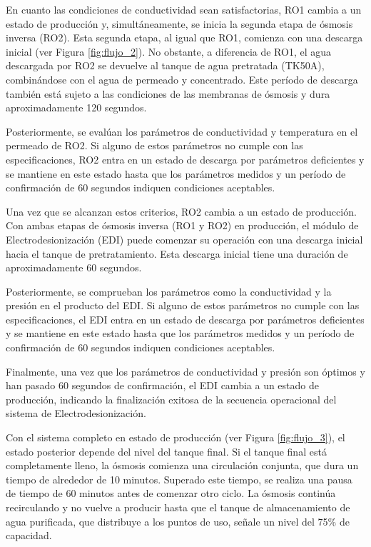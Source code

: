 En cuanto las condiciones de conductividad sean satisfactorias, RO1 cambia a un estado de producción
y, simultáneamente, se inicia la segunda etapa de ósmosis inversa (RO2). Esta segunda etapa, al
igual que RO1, comienza con una descarga inicial (ver Figura \ref{fig:flujo_2}). No obstante, a diferencia de RO1, el agua
descargada por RO2 se devuelve al tanque de agua pretratada (TK50A), combinándose con el agua
de permeado y concentrado. Este período de descarga también está sujeto a las condiciones de
las membranas de ósmosis y dura aproximadamente 120 segundos.

Posteriormente, se evalúan los parámetros de conductividad y temperatura en el permeado de RO2.
Si alguno de estos parámetros no cumple con las especificaciones, RO2 entra en un estado de descarga
por parámetros deficientes y se mantiene en este estado hasta que los parámetros medidos y un período
de confirmación de 60 segundos indiquen condiciones aceptables.



Una vez que se alcanzan estos criterios, RO2 cambia a un estado de producción. Con ambas etapas de
ósmosis inversa (RO1 y RO2) en producción, el módulo de Electrodesionización (EDI) puede comenzar su
operación con una descarga inicial hacia el tanque de pretratamiento. Esta descarga inicial tiene
una duración de aproximadamente 60 segundos.

Posteriormente, se comprueban los parámetros como la conductividad y la presión en el producto del EDI.
Si alguno de estos parámetros no cumple con las especificaciones, el EDI entra en un estado de descarga
por parámetros deficientes y se mantiene en este estado hasta que los parámetros medidos y un período
de confirmación de 60 segundos indiquen condiciones aceptables.

Finalmente, una vez que los parámetros de conductividad y presión son óptimos y han pasado 60 segundos
de confirmación, el EDI cambia a un estado de producción, indicando la finalización exitosa de la
secuencia operacional del sistema de Electrodesionización.

Con el sistema completo en estado de producción (ver Figura \ref{fig:flujo_3}), el estado
posterior depende del nivel del tanque final. Si el tanque final está
completamente lleno, la ósmosis comienza una circulación conjunta, que dura un
tiempo de alrededor de 10 minutos. Superado este tiempo, se realiza una pausa de tiempo de 60 minutos antes de
comenzar otro ciclo. La ósmosis continúa recirculando y no vuelve a producir
hasta que el tanque de almacenamiento de agua purificada, que distribuye a los
puntos de uso, señale un nivel del 75\% de capacidad.

